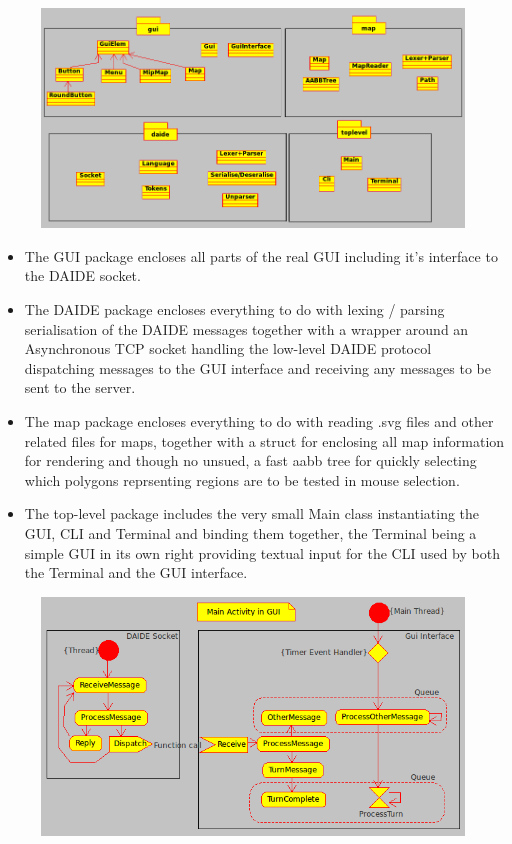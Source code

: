 \begin{figure}
\includegraphics[scale=0.5]{./gui/UML.png}\\[0.5cm]
\end{figure}

\begin{itemize}

\item The GUI package encloses all parts of the real GUI including it's
      interface to the DAIDE socket.
\item The DAIDE package encloses everything to do with lexing / parsing 
      serialisation of the DAIDE messages together with a wrapper around
      an Asynchronous TCP socket handling the low-level DAIDE protocol
      dispatching messages to the GUI interface and receiving any messages
      to be sent to the server.
\item The map package encloses everything to do with reading .svg files
      and other related files for maps, together with a struct for 
      enclosing all map information for rendering and though no unsued,
      a fast aabb tree for quickly selecting which polygons reprsenting
      regions are to be tested in mouse selection.
\item The top-level package includes the very small Main class instantiating
      the GUI, CLI and Terminal and binding them together, the Terminal
      being a simple GUI in its own right providing textual input for the
      CLI used by both the Terminal and the GUI interface.

\end{itemize}

\begin{figure}
\includegraphics[scale=0.5]{./gui/Activity.png}\\[0.5cm]
\end{figure}

